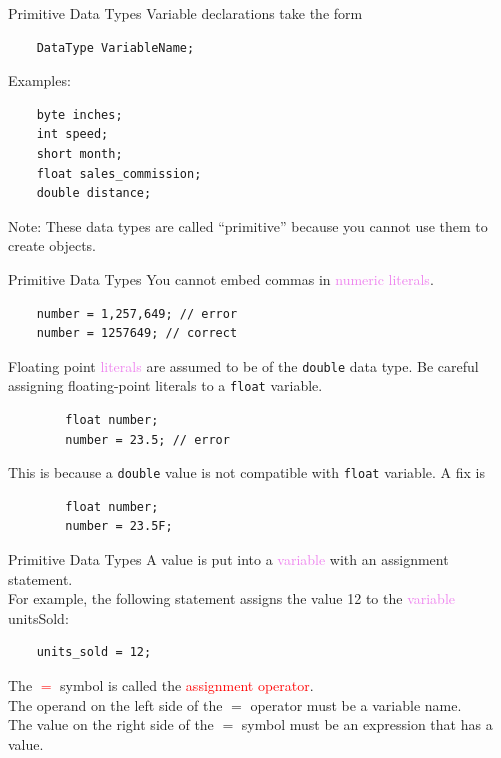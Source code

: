 \documentclass[11pt]{beamer}
\newcommand{\red}[1]{\textcolor{red}{#1}}
\newcommand{\violet}[1]{\textcolor{violet}{#1}}
\begin{document}
\begin{frame}[fragile]{Primitive Data Types}
    Variable declarations take the form
    \begin{lstlisting}
    DataType VariableName;
    \end{lstlisting}
    Examples:
    \begin{lstlisting}
    byte inches;
    int speed;
    short month;
    float sales_commission;
    double distance;
    \end{lstlisting}
    Note: These data types are called ``primitive'' because you cannot use them to create objects.
\end{frame}

\begin{frame}[fragile]{Primitive Data Types}
    You cannot embed commas in \violet{numeric literals}.
    \begin{lstlisting}
    number = 1,257,649; // error
    number = 1257649; // correct
    \end{lstlisting}
    Floating point \violet{literals} are assumed to be of the \texttt{double} data type. Be careful assigning floating-point literals to a \texttt{float} variable.
    \begin{lstlisting}
        float number;
        number = 23.5; // error
    \end{lstlisting}
    This is because a \texttt{double} value is not compatible with \texttt{float} variable. A fix is
    \begin{lstlisting}
        float number;
        number = 23.5F;
    \end{lstlisting}
\end{frame}

\begin{frame}[fragile]{Primitive Data Types}
    A value is put into a \violet{variable} with an assignment statement. \\ \vspace{1em}
    For example, the following statement assigns the value 12 to the \violet{variable} unitsSold:
    \begin{lstlisting}
    units_sold = 12;
    \end{lstlisting}
    The \red{$=$} symbol is called the \red{assignment operator}. \\ \vspace{1em}
    The operand on the left side of the $=$ operator must be a variable name. \\ \vspace{1em}
    The value on the right side of the $=$ symbol must be an expression that has a value.
\end{frame}
\end{document}
